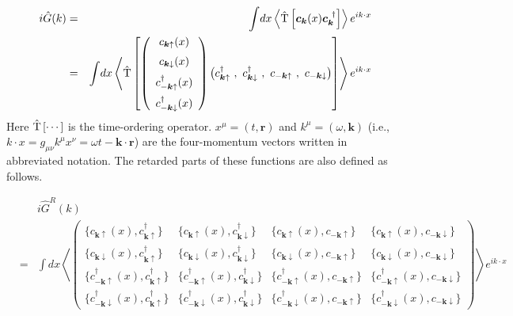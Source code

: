 \documentclass[uplatex,a4j,12pt,dvipdfmx]{jsarticle}
\begin{document}
\begin{eqnarray}
	i
	\hat{G}(k)
	&=&
	\int \! dx
	\left\langle \hat{\rm T} \left[ \bm{c}_{\bm{k}}(x) \bm{c}_{\bm{k}}^{\ \dagger} \right] \right\rangle
	e^{ i k \cdot x }
	\nonumber \\ &=&
	\int \! dx
	\left\langle \hat{\rm T} \left[
		\left(
		\begin{array}{c}
				c_{\bm{k} \uparrow}(x)            \\[2mm]
				c_{\bm{k} \downarrow}(x)          \\[2mm]
				c^{\dagger}_{-\bm{k} \uparrow}(x) \\[2mm]
				c^{\dagger}_{-\bm{k} \downarrow}(x)
			\end{array}
		\right)
		\big( c^{\dagger}_{\bm{k} \uparrow} \ , \ c^{\dagger}_{\bm{k} \downarrow} \ , \ c_{-\bm{k} \uparrow} \ , \ c_{-\bm{k} \downarrow}  \big)
		\right]
	\right\rangle
	e^{ i k \cdot x }
\end{eqnarray}
%
Here $\hat{\rm T} \left[ \cdots \right]$ is the time-ordering operator.
$x^{\mu}=(t,\bm{r})$ and $k^{\mu}=(\omega,\bm{k})$
(i.e., $k \cdot x = g_{\mu \nu} k^{\mu} x^{\nu} = \omega t- \bm{k} \cdot \bm{r}$)
are the four-momentum vectors written in abbreviated notation.
The retarded parts of these functions are also defined as follows.

\begin{eqnarray}
	&&
	i
	\hat{G}^{R}(k)
	\nonumber \\ &=&
	\int \! dx
	\left\langle
	\left(
	\begin{array}{cccc}
			\{ c_{\bm{k}\uparrow}(x), c_{\bm{k}\uparrow}^{\dagger} \}                & \{ c_{\bm{k}\uparrow}(x), c^{\dagger}_{\bm{k} \downarrow} \}               & \{ c_{\bm{k} \uparrow}(x), c_{-\bm{k} \uparrow} \}              & \{ c_{\bm{k} \uparrow}(x), c_{-\bm{k} \downarrow} \}
			\\[3mm]
			\{ c_{\bm{k} \downarrow}(x), c_{\bm{k}\uparrow}^{\dagger} \}             & \{ c_{\bm{k} \downarrow}(x), c^{\dagger}_{\bm{k} \downarrow} \}            & \{ c_{\bm{k} \downarrow}(x), c_{-\bm{k} \uparrow} \}            & \{ c_{\bm{k} \downarrow}(x), c_{-\bm{k} \downarrow} \}
			\\[3mm]
			\{ c^{\dagger}_{-\bm{k} \uparrow}(x), c^{\dagger}_{\bm{k} \uparrow} \}   & \{ c^{\dagger}_{-\bm{k} \uparrow}(x), c^{\dagger}_{\bm{k} \downarrow} \}   & \{ c^{\dagger}_{-\bm{k} \uparrow}(x), c_{-\bm{k} \uparrow} \}   & \{ c^{\dagger}_{-\bm{k} \uparrow}(x), c_{-\bm{k} \downarrow} \}
			\\[3mm]
			\{ c^{\dagger}_{-\bm{k} \downarrow}(x), c^{\dagger}_{\bm{k} \uparrow} \} & \{ c^{\dagger}_{-\bm{k} \downarrow}(x), c^{\dagger}_{\bm{k} \downarrow} \} & \{ c^{\dagger}_{-\bm{k} \downarrow}(x), c_{-\bm{k} \uparrow} \} & \{ c^{\dagger}_{-\bm{k} \downarrow}(x), c_{-\bm{k} \downarrow} \}
		\end{array}
	\right)
	\right\rangle
	e^{ i k \cdot x }
\end{eqnarray}
%
\end{document}
